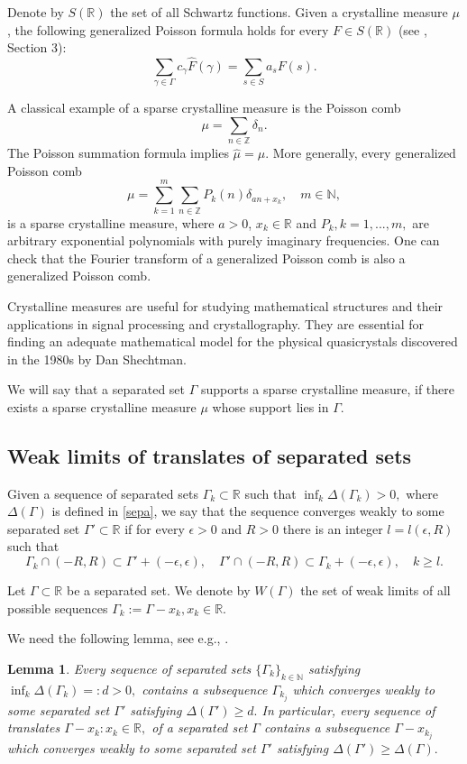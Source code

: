 \documentclass[12pt]{amsart}
\numberwithin{equation}{section}
\newtheorem{lemma}[theorem]{Lemma}
\newcommand{\R}{{\mathbb R}} \newcommand{\Q}{{\mathbb Q}} \newcommand{\Z}{{\mathbb Z}} \newcommand{\N}{{\mathbb N}}
\begin{document}
Denote by $S(\R)$ the set of all Schwartz functions. Given a crystalline measure $\mu$, the following generalized Poisson formula holds for every  $F\in S(\R)$ (see \cite{Meyer_TN}, Section 3): 
\begin{equation}\label{crys}
    \sum_{\gamma\in\Gamma}c_\gamma \hat F(\gamma)=\sum_{s\in S}a_s F(s).
\end{equation}

A classical example of a sparse crystalline measure is the Poisson comb $$\mu=\sum_{n\in\Z}\delta_n.$$The Poisson summation formula implies $\hat\mu=\mu.$
More generally, every generalized Poisson comb \begin{equation}\label{poi}
    \mu=\sum_{k=1}^m\sum_{n\in\Z}P_k(n)\delta_{an+x_k},\quad m\in\N,\end{equation}is a sparse crystalline measure, where $a>0$, $x_k\in\R$ and $P_k, k=1,...,m,$ are arbitrary exponential polynomials with purely imaginary frequencies. One can check that the Fourier transform of a generalized Poisson comb is also a generalized Poisson comb.

Crystalline measures are useful for studying mathematical structures and their applications in signal processing and crystallography.
They are essential for finding an adequate mathematical model for the physical quasicrystals discovered in the 1980s by  Dan Shechtman.

 We will say that a separated set $\Gamma$ supports a sparse crystalline measure, if there exists a sparse crystalline measure $\mu$ whose support lies in $\Gamma$.

\subsection{Weak limits  of translates of  separated sets}
Given a sequence of separated sets $\Gamma_k\subset\R$ such that $\inf_k \Delta(\Gamma_k) > 0,$ where $\Delta(\Gamma)$ is defined in \eqref{sepa}, we say that the sequence converges weakly to some separated set  $\Gamma' \subset \R$ if for every $\epsilon>0$ and $R>0$ there is an integer $l=l(\epsilon, R)$ such that
$$\Gamma_k\cap(-R,R) \subset \Gamma'+(-\epsilon, \epsilon),\quad \Gamma'\cap(-R,R)\subset \Gamma_k+(-\epsilon, \epsilon), \quad k\geq l. $$


Let $\Gamma\subset\R$ be a separated set. We denote by $W(\Gamma)$ the set of weak limits of all possible sequences $\Gamma_k:=\Gamma-x_k, x_k\in\R.$ 

We need the following lemma, see e.g., \cite[Lecture~3]{ou}.
\begin{lemma}\label{lsep} Every sequence of separated sets 
$\{\Gamma_k\}_{k\in\N}$ satisfying $\inf_k \Delta(\Gamma_k)=:d > 0,$ contains a subsequence $\Gamma_{k_j}$ which converges weakly to some separated set $\Gamma'$ satisfying  $ \Delta(\Gamma')\geq d.$
In particular, every sequence of translates  $\Gamma -x_k: x_k\in\R,$ of a separated set $\Gamma$ contains a subsequence $\Gamma-x_{k_j}$ which  converges weakly to some separated set $\Gamma'$ satisfying $\Delta(\Gamma')\geq \Delta(\Gamma).$
\end{lemma}
\end{document}
